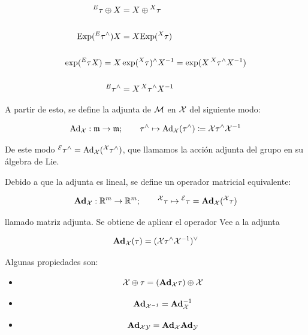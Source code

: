 \begin{equation}
\begin{split}
\prescript{E}{}{\tau} \oplus X &= X \oplus \prescript{X}{}{\tau} \\\\
\text{Exp}(\prescript{E}{}{\tau}^\wedge) X &= 
X \text{Exp}(\prescript{X}{}{\tau})
\\\\
%
\exp(\prescript{E}{}{\tau}X) =
X &\exp(\prescript{X}{}{\tau})^\wedge X^{-1} = 
\exp(X \prescript{X}{}{\tau}^\wedge X^{-1}) \\\\
\prescript{E}{}{\tau}^\wedge &= 
X \prescript{X}{}{\tau}^\wedge X^{-1}
\end{split}
\end{equation}

A partir de esto, se define la adjunta de $\mathcal{M}$ en $\mathcal{X}$ del siguiente modo:

$$
\text{Ad}_{\mathcal{X}} : \mathfrak{m} \to \mathfrak{m}; \qquad
\tau^\wedge \mapsto \text{Ad}_{\mathcal{X}}(\tau^\wedge) \coloneq
\mathcal{X} \tau^\wedge \mathcal{X}^{-1}
$$

De este modo $\prescript{\mathcal{E}}{}{\tau}^\wedge = \text{Ad}_{\mathcal{X}}(\prescript{\mathcal{X}}{}{\tau}^\wedge)$, que llamamos la acción adjunta del grupo en su álgebra de Lie.

Debido a que la adjunta es lineal, se define un operador matricial equivalente:

$$
\textbf{Ad}_{\mathcal{X}} : \mathbb{R}^m \to \mathbb{R}^m; \qquad
\prescript{\mathcal{X}}{}{\tau} \mapsto \prescript{\mathcal{E}}{}{\tau} = 
\textbf{Ad}_{\mathcal{X}} (\prescript{\mathcal{X}}{}{\tau})
$$

\noindent llamado matriz adjunta. Se obtiene de aplicar el operador Vee a la adjunta

$$
\textbf{Ad}_{\mathcal{X}}(\tau) = (\mathcal{X} \tau^\wedge \mathcal{X}^{-1})^\vee
$$

Algunas propiedades son:

\begin{itemize}
    \item
    $$
    \mathcal{X} \oplus \tau = (\textbf{Ad}_{\mathcal{X}} \tau) \oplus \mathcal{X}
    $$
    \item 
    $$
    \textbf{Ad}_{\mathcal{X}^{-1}} = \textbf{Ad}_{\mathcal{X}}^{-1}
    $$
    \item 
    $$
    \textbf{Ad}_{\mathcal{X}\mathcal{Y}} = \textbf{Ad}_{\mathcal{X}} \textbf{Ad}_{\mathcal{Y}}
    $$
\end{itemize}



